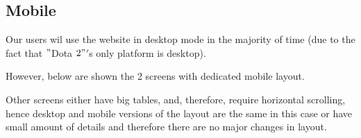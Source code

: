     \clearpage

    \subsection{Mobile}

    Our users wil use the website in desktop mode in the majority of time (due to the fact that \("\)Dota \(2"\)\('\)s only platform is desktop).

    \vspace{1em}
    However, below are shown the 2 screens with dedicated mobile layout.

    \vspace{1em}
    Other screens either have big tables, and, therefore, require horizontal scrolling, hence desktop and mobile versions of the layout are the same in this case
    or have small amount of details and therefore there are no major changes in layout.

